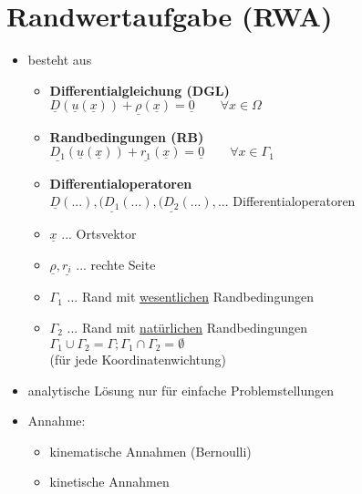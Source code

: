 \section{Randwertaufgabe (RWA)}
\begin{itemize}
\item besteht aus 
	\begin{itemize}
	\item \textbf{Differentialgleichung (DGL)}\\
		\(\underline{D}(\underline{u}(\underline{x})) + \underline{\rho}(\underline{x}) = \underline{0} \qquad \forall x \in \Omega\)
	
	\item \textbf{Randbedingungen (RB)}\\
		\(\underline{D_1}(\underline{u}(\underline{x})) + \underline{r_1}(\underline{x}) = \underline{0} \qquad \forall x \in \Gamma_1\)
		
	\item \textbf{Differentialoperatoren}\\
		\(\underline{D}(...), (\underline{D_1}(...), (\underline{D_2}(...), ...\) Differentialoperatoren
	\item \(\underline{x}\) ... Ortsvektor
	\item \(\underline{\rho}, \underline{r_i}\) ... rechte Seite
	\item \(\Gamma_1\) ... Rand mit \underline{wesentlichen} Randbedingungen
	\item \(\Gamma_2\) ... Rand mit \underline{natürlichen} Randbedingungen\\
		\(\Gamma_1 \cup \Gamma_2 = \Gamma; \Gamma_1 \cap \Gamma_2 = \emptyset\)\\
		(für jede Koordinatenwichtung)
	\end{itemize}
	\item analytische Lösung nur für einfache Problemstellungen 
	\item Annahme: 
		\begin{itemize}
		\item kinematische Annahmen (Bernoulli)
		\item kinetische Annahmen
		\end{itemize}
\end{itemize}

